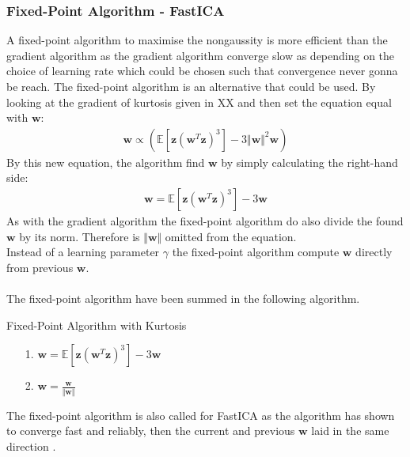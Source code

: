 \subsubsection*{Fixed-Point Algorithm - FastICA}
A fixed-point algorithm to maximise the nongaussity is more efficient than the gradient algorithm as the gradient algorithm converge slow as depending on the choice of learning rate which could be chosen such that convergence never gonna be reach. The fixed-point algorithm is an alternative that could be used.
By looking at the gradient of kurtosis given in XX and then set the equation equal with $\mathbf{w}$:
\begin{align*}
\mathbf{w} \propto ( \mathbb{E}[\mathbf{z}(\mathbf{w}^T \mathbf{z})^3] - 3 \Vert \mathbf{w} \Vert^2 \mathbf{w})
\end{align*}
By this new equation, the algorithm find $\mathbf{w}$ by simply calculating the right-hand side:
\begin{align*}
\mathbf{w} = \mathbb{E}[\mathbf{z}(\mathbf{w}^T \mathbf{z})^3] - 3 \mathbf{w}
\end{align*}
As with the gradient algorithm the fixed-point algorithm do also divide the found $\mathbf{w}$ by its norm. Therefore is $\Vert \mathbf{w} \Vert$ omitted from the equation.
\\
Instead of a learning parameter $\gamma$ the fixed-point algorithm compute $\mathbf{w}$ directly from previous $\mathbf{w}$.
\\ \\
The fixed-point algorithm have been summed in the following algorithm.
\begin{algorithm}[H]
\caption{Fixed-Point Algorithm with Kurtosis}
\begin{itemize}
\item[1.] $\mathbf{w} = \mathbb{E}[\mathbf{z}(\mathbf{w}^T \mathbf{z})^3] - 3 \mathbf{w}$
\item[2.] $\mathbf{w} = \frac{\mathbf{w}}{\Vert \mathbf{w} \Vert}$
\end{itemize}
\end{algorithm}
The fixed-point algorithm is also called for FastICA as the algorithm has shown to converge fast and reliably, then the current and previous $\mathbf{w}$ laid in the same direction \cite[p. 179]{ICA}. 


